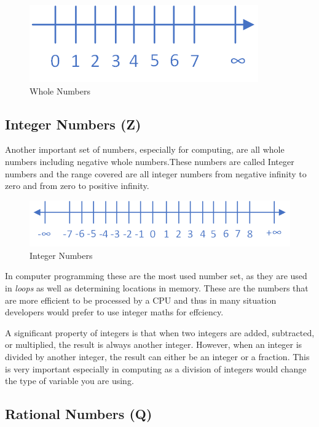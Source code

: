 \documentclass[
]{book}
\begin{document}
\begin{figure}

{\centering \includegraphics[width=0.4\linewidth]{images/Whole Numbers} 

}

\caption{Whole Numbers}\label{fig:unnamed-chunk-4}
\end{figure}

\hypertarget{integer-numbers-z}{%
\subsection{Integer Numbers (Z)}\label{integer-numbers-z}}

Another important set of numbers, especially for computing, are all whole numbers including negative whole numbers.These numbers are called Integer numbers and the range covered are all integer numbers from negative infinity to zero and from zero to positive infinity.

\begin{figure}

{\centering \includegraphics[width=0.6\linewidth]{images/Integer Numbers} 

}

\caption{Integer Numbers}\label{fig:unnamed-chunk-5}
\end{figure}

In computer programming these are the most used number set, as they are used in \emph{loops} as well as determining locations in memory. These are the numbers that are more efficient to be processed by a CPU and thus in many situation developers would prefer to use integer maths for effciency.

A significant property of integers is that when two integers are added, subtracted, or multiplied, the result is always another integer. However, when an integer is divided by another integer, the result can either be an integer or a fraction. This is very important especially in computing as a division of integers would change the type of variable you are using.

\hypertarget{rational-numbers-q}{%
\subsection{Rational Numbers (Q)}\label{rational-numbers-q}}
\end{document}
